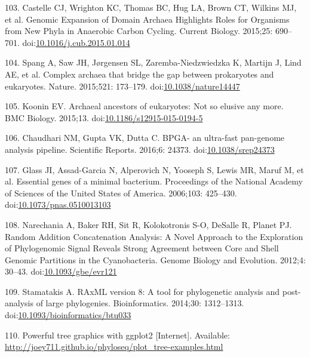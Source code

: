 \documentclass[12pt,twoside]{reedthesis}
\begin{document}
  \hypertarget{ref-castelleux5fgenomicux5f2015}{}
  103. Castelle CJ, Wrighton KC, Thomas BC, Hug LA, Brown CT, Wilkins MJ,
  et al. Genomic Expansion of Domain Archaea Highlights Roles for
  Organisms from New Phyla in Anaerobic Carbon Cycling. Current Biology.
  2015;25: 690--701.
  doi:\href{https://doi.org/10.1016/j.cub.2015.01.014}{10.1016/j.cub.2015.01.014}
  
  \hypertarget{ref-spangux5fcomplexux5f2015}{}
  104. Spang A, Saw JH, Jørgensen SL, Zaremba-Niedzwiedzka K, Martijn J,
  Lind AE, et al. Complex archaea that bridge the gap between prokaryotes
  and eukaryotes. Nature. 2015;521: 173--179.
  doi:\href{https://doi.org/10.1038/nature14447}{10.1038/nature14447}
  
  \hypertarget{ref-kooninux5farchaealux5f2015}{}
  105. Koonin EV. Archaeal ancestors of eukaryotes: Not so elusive any
  more. BMC Biology. 2015;13.
  doi:\href{https://doi.org/10.1186/s12915-015-0194-5}{10.1186/s12915-015-0194-5}
  
  \hypertarget{ref-chaudhariux5fbpga-ux5f2016}{}
  106. Chaudhari NM, Gupta VK, Dutta C. BPGA- an ultra-fast pan-genome
  analysis pipeline. Scientific Reports. 2016;6: 24373.
  doi:\href{https://doi.org/10.1038/srep24373}{10.1038/srep24373}
  
  \hypertarget{ref-glassux5fessentialux5f2006}{}
  107. Glass JI, Assad-Garcia N, Alperovich N, Yooseph S, Lewis MR, Maruf
  M, et al. Essential genes of a minimal bacterium. Proceedings of the
  National Academy of Sciences of the United States of America. 2006;103:
  425--430.
  doi:\href{https://doi.org/10.1073/pnas.0510013103}{10.1073/pnas.0510013103}
  
  \hypertarget{ref-narechaniaux5frandomux5f2012}{}
  108. Narechania A, Baker RH, Sit R, Kolokotronis S-O, DeSalle R, Planet
  PJ. Random Addition Concatenation Analysis: A Novel Approach to the
  Exploration of Phylogenomic Signal Reveals Strong Agreement between Core
  and Shell Genomic Partitions in the Cyanobacteria. Genome Biology and
  Evolution. 2012;4: 30--43.
  doi:\href{https://doi.org/10.1093/gbe/evr121}{10.1093/gbe/evr121}
  
  \hypertarget{ref-stamatakisux5fraxmlux5f2014}{}
  109. Stamatakis A. RAxML version 8: A tool for phylogenetic analysis and
  post-analysis of large phylogenies. Bioinformatics. 2014;30: 1312--1313.
  doi:\href{https://doi.org/10.1093/bioinformatics/btu033}{10.1093/bioinformatics/btu033}
  
  \hypertarget{ref-phylosequx5fpowerfulux5f2016}{}
  110. Powerful tree graphics with ggplot2 {[}Internet{]}. Available:
  \url{http://joey711.github.io/phyloseq/plot_tree-examples.html}
  
\end{document}
